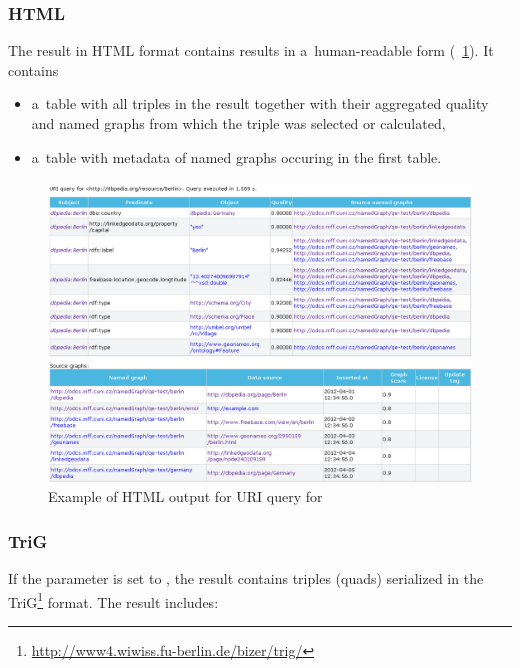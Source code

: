 \subsubsection{HTML}

The result in HTML format contains results in a~human-readable form (\figurename~\ref{fig:uriQuery}). It contains

\begin{itemize}
	\item a~table with all triples in the result together with their aggregated quality and named graphs from which the triple was selected or calculated,
  \item  a~table with metadata of named graphs occuring in the first table.
\end{itemize}

\begin{figure}[htb]
    \centering
    \includegraphics[width=\textwidth]{images/uri-query-screenshot.png}
    \caption{Example of HTML output for URI query for }
	\label{fig:uriQuery}
\end{figure}

\subsubsection{TriG}
\label{sec:URIKWTrig}

If the  parameter is set to , the result contains triples (quads) serialized in the TriG\footnote{\url{http://www4.wiwiss.fu-berlin.de/bizer/trig/}} format. The result includes:

